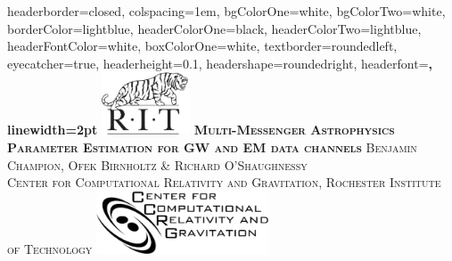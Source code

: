 \documentclass[landscape,a0paper,fontscale=0.285]{baposter} %
\begin{document}
\begin{poster}
{
headerborder=closed, %
colspacing=1em, %
bgColorOne=white, %
bgColorTwo=white, %
borderColor=lightblue, %
headerColorOne=black, %
headerColorTwo=lightblue, %
headerFontColor=white, %
boxColorOne=white, %
textborder=roundedleft, %
eyecatcher=true, %
headerheight=0.1\textheight, %
headershape=roundedright, %
headerfont=\Large\bf\textsc, %
linewidth=2pt %
}
%
{\includegraphics[height=5em]{RIT_tiger.png}} %
{\bf\textsc{Multi-Messenger Astrophysics Parameter Estimation for GW
and EM data channels}\vspace{-0.1em}} %
{\textsc{ Benjamin Champion, Ofek Birnholtz \& Richard O'Shaughnessy \\
	\hspace{12pt} Center for Computational Relativity and Gravitation, Rochester Institute of Technology}}
{\includegraphics[height=5em]{ccrg_logo.png}} %


\end{poster}
\end{document}
